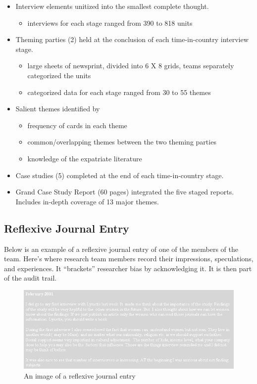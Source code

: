 \documentclass[
  english,
]{book}
\providecommand{\tightlist}{%
  \setlength{\itemsep}{0pt}\setlength{\parskip}{0pt}}
\begin{document}
\begin{itemize}
\tightlist
\item
  Interview elements unitized into the smallest complete thought.

  \begin{itemize}
  \tightlist
  \item
    interviews for each stage ranged from 390 to 818 units
  \end{itemize}
\item
  Theming parties (2) held at the conclusion of each time-in-country interview stage.

  \begin{itemize}
  \tightlist
  \item
    large sheets of newsprint, divided into 6 X 8 grids, teams separately categorized the units
  \item
    categorized data for each stage ranged from 30 to 55 themes
  \end{itemize}
\item
  Salient themes identified by

  \begin{itemize}
  \tightlist
  \item
    frequency of cards in each theme
  \item
    common/overlapping themes between the two theming parties
  \item
    knowledge of the expatriate literature
  \end{itemize}
\item
  Case studies (5) completed at the end of each time-in-country stage.
\item
  Grand Case Study Report (60 pages) integrated the five staged reports. Includes in-depth coverage of 13 major themes.
\end{itemize}

\hypertarget{reflexive-journal-entry}{%
\subsection{Reflexive Journal Entry}\label{reflexive-journal-entry}}

Below is an example of a reflexive journal entry of one of the members of the team. Here's where research team members record their impressions, speculations, and experiences. It ``brackets'' researcher bias by acknowledging it. It is then part of the audit trail.

\begin{figure}
\centering
\includegraphics{images/Qualitative/ReflexiveJournal.png}
\caption{An image of a reflexive journal entry}
\end{figure}
\end{document}
